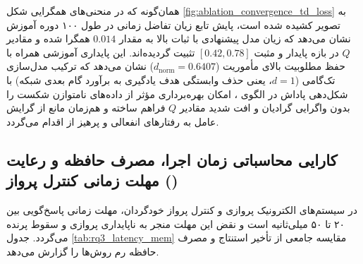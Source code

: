 \documentclass[oneside,openany,phd]{TMU-Thesis}
\begin{document}
همان‌گونه که در منحنی‌های همگرایی شکل \ref{fig:ablation_convergence_td_loss} به تصویر کشیده شده است، پایش تابع زیان تفاضل زمانی در طول ۱۰۰ دوره آموزش نشان می‌دهد که زیان مدل پیشنهادی با ثبات بالا به مقدار $0.014$ همگرا شده و مقادیر $Q$ در بازه پایدار و مثبت $[0.42, 0.78]$ تثبیت گردیده‌اند. این پایداری آموزشی همراه با حفظ مطلوبیت بالای مأموریت ($d_{\text{norm}} = 0.6407$) نشان می‌دهد که ترکیب مدل‌سازی تک‌گامی ($d=1$، یعنی حذف وابستگی هدف یادگیری به برآورد گام بعدی شبکه) با شکل‌دهی پاداش در الگوی \sgos، امکان بهره‌برداری مؤثر از داده‌های نامتوازن شکست را بدون واگرایی گرادیان و افت شدید مقادیر $Q$ فراهم ساخته و هم‌زمان مانع از گرایش عامل به رفتارهای انفعالی و پرهیز از اقدام می‌گردد.

\subsection{کارایی محاسباتی زمان اجرا، مصرف حافظه و رعایت مهلت زمانی کنترل پرواز ()}
\label{subsec:dartsim_latency}

در سیستم‌های الکترونیک پروازی و کنترل پرواز خودگردان، مهلت زمانی پاسخ‌گویی بین ۲۰ تا ۵۰ میلی‌ثانیه است و نقض این مهلت منجر به ناپایداری پروازی و سقوط پرنده می‌گردد. جدول \ref{tab:rq3_latency_mem} مقایسه جامعی از تأخیر استنتاج و مصرف حافظه رم روش‌ها را گزارش می‌دهد.
\end{document}
